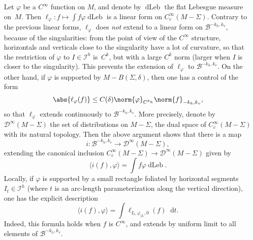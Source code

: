 \documentclass[10pt]{amsart}
\newcommand{\boI}{\mathcal{I}}
\newcommand{\boB}{\mathcal{B}}
\newcommand{\boD}{\mathcal{D}}
\newcommand{\dd}{\mathop{}\!\mathrm{d}}
\newcommand{\restr}{|}
\DeclareMathOperator{\dLeb}{dLeb}
\let\phi\varphi
\theoremstyle{definition}
\numberwithin{equation}{section}
\begin{document}
Let $\phi$ be a $C^\infty$ function on $M$, and denote by $\dLeb$ the flat
Lebesgue measure on~$M$. Then $\ell_\phi : f \mapsto \int f \phi \dLeb$ is a
linear form on $C^\infty_c(M-\Sigma)$. Contrary to the previous linear forms,
$\ell_\phi$ does \emph{not} extend to a linear form on $\boB^{-k_h, k_v}$,
because of the singularities: from the point of view of the $C^\infty$
structure, horizontals and verticals close to the singularity have a lot of
curvature, so that the restriction of $\phi$ to $I \in \boI^h$ is~$C^k$, but
with a large $C^k$ norm (larger when $I$ is closer to the singularity).
This prevents the extension of $\ell_\phi$ to $\boB^{-k_h, k_v}$. On the
other hand, if $\phi$ is supported by $M-B(\Sigma, \delta)$, then one has a
control of the form
\[
\abs{\ell_\phi(f)} \leq C(\delta)
\norm{\phi}_{C^{k_h}}\norm{f}_{-k_h, k_v},
\]
so that $\ell_\phi$ extends
continuously to $\boB^{-k_h, k_v}$. More precisely, denote by
$\boD^\infty(M-\Sigma)$ the set of distributions on $M-\Sigma$, \ie the
dual space of $C^\infty_c(M-\Sigma)$ with its natural topology. Then the
above argument shows that there is a map
\[
i : \boB^{-k_h, k_v} \to
\boD^\infty(M-\Sigma),
\]
extending the canonical inclusion
$C^\infty_c(M-\Sigma) \to \boD^\infty(M-\Sigma)$ given by
\[
\langle i(f), \phi
\rangle = \int f \phi \dLeb.
\]
Locally, if $\phi$ is supported by a small
rectangle foliated by horizontal segments $I_t \in \boI^h$ (where $t$ is an
arc-length parameterization along the vertical direction), one has the
explicit description
\begin{equation}
\label{eq:decrit_if}
\langle i(f), \phi \rangle = \int \ell_{I_t, \phi_{\restr I_t}, 0}(f) \dd t.
\end{equation}
Indeed, this formula holds when $f$ is $C^\infty$, and extends by uniform
limit to all elements of $\boB^{-k_h, k_v}$.
\end{document}

